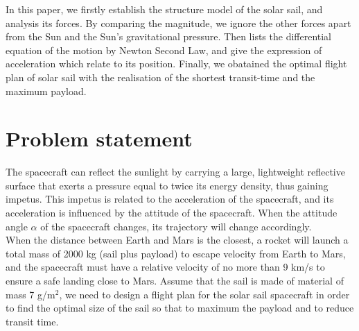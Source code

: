\documentclass[../Paper.tex]{subfiles}
\begin{document}
In this paper, we firstly establish the structure model of the solar sail, and analysis its forces. By comparing the magnitude, we ignore the other forces apart from the Sun and the Sun's gravitational pressure. Then lists the differential equation of the motion by Newton Second Law, and give the expression of acceleration which relate to its position. Finally, we obatained the optimal flight plan of solar sail with the realisation of the shortest transit-time and the maximum payload. 

\section{Problem statement}

The spacecraft can reflect the sunlight by carrying a large, lightweight reflective surface that exerts a pressure equal to twice its energy density, thus gaining impetus. This impetus is related to the acceleration of the spacecraft, and its acceleration is influenced by the attitude of the spacecraft. When the attitude angle $\alpha$ of the spacecraft changes, its trajectory will change accordingly. 
\\

When the distance between Earth and Mars is the closest, a rocket will launch a total mass of 2000 kg (sail plus payload) to escape velocity from Earth to Mars, and the spacecraft must have a relative velocity of no more than 9 km/s to ensure a safe landing close to Mars. Assume that the sail is made of material of mass 7 g/m$^2$, we need to design a flight plan for the solar sail spacecraft in order to find the optimal size of the sail so that to maximum the payload and to reduce transit time.
\end{document}
